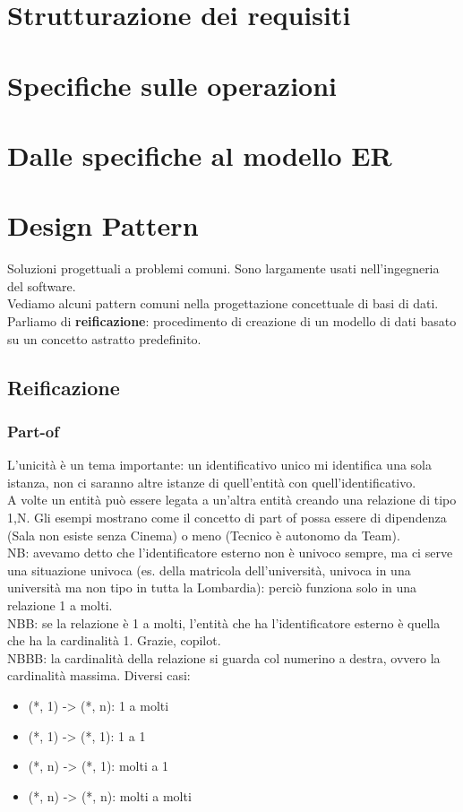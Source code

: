 \section{Strutturazione dei requisiti}

\section{Specifiche sulle operazioni}

\section{Dalle specifiche al modello ER}

\section{Design Pattern}
Soluzioni progettuali a problemi comuni. Sono largamente usati nell'ingegneria del software.
\\Vediamo alcuni pattern comuni nella progettazione concettuale di basi di dati.
\\Parliamo di \textbf{reificazione}: procedimento di creazione di un modello di dati basato su un concetto astratto predefinito.
\subsection{Reificazione}

\subsubsection{Part-of}
L'unicità è un tema importante: un identificativo unico mi identifica una sola istanza, non ci saranno altre istanze di quell'entità con quell'identificativo.
\\A volte un entità può essere legata a un'altra entità creando una relazione di tipo 1,N. Gli esempi mostrano come il concetto di part of possa essere di dipendenza (Sala non esiste senza Cinema) o meno (Tecnico è autonomo da Team).
\\NB: avevamo detto che l'identificatore esterno non è univoco sempre, ma ci serve una situazione univoca (es. della matricola dell'università, univoca in una università ma non tipo in tutta la Lombardia): perciò funziona solo in una relazione 1 a molti.
\\NBB: se la relazione è 1 a molti, l'entità che ha l'identificatore esterno è quella che ha la cardinalità 1. Grazie, copilot.
\\NBBB: la cardinalità della relazione si guarda col numerino a destra, ovvero la cardinalità massima. Diversi casi:
\begin{itemize}
    \item (*, 1) -> (*, n): 1 a molti
    \item (*, 1) -> (*, 1): 1 a 1
    \item (*, n) -> (*, 1): molti a 1
    \item (*, n) -> (*, n): molti a molti
\end{itemize}

